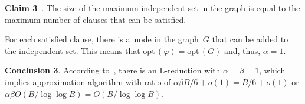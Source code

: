 \begin{multicols}{2}
\columnbreak

\noindent
\textbf{Claim 3}~\cite{MSAT3Example, P1994}. The size of the maximum independent
set in the graph is equal to the maximum number of clauses that can
be satisfied.

\smallskip

For each satisfied clause, there is a~node in the graph~$G$ that can be added to the independent set. This means that
$\mathrm{opt}\,(\varphi) = \mathrm{opt}\,(G)$ and, thus, $\alpha = 1$.

\smallskip

\noindent
\textbf{Conclusion 3}.
According to~\cite{MSAT3Example, P1994},
there is an \mbox{L-reduction} with $\alpha = \beta = 1$, which implies
approximation algorithm with ratio of $\alpha\beta B/6+o(1) =
B/6+o(1)$ or $\alpha\beta O({B}/{\log\log B}) =
O({B}/{\log\log B})$.

\smallskip


\end{multicols}

